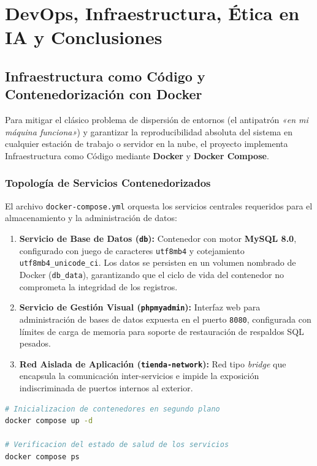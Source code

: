 ﻿\chapter{DevOps, Infraestructura, Ética en IA y Conclusiones}
\label{cap:devops_conclusiones}

\section{Infraestructura como Código y Contenedorización con Docker}
Para mitigar el clásico problema de dispersión de entornos (el antipatrón \textit{«en mi máquina funciona»}) y garantizar la reproducibilidad absoluta del sistema en cualquier estación de trabajo o servidor en la nube, el proyecto implementa Infraestructura como Código mediante \textbf{Docker} y \textbf{Docker Compose}.

\subsection{Topología de Servicios Contenedorizados}
El archivo \texttt{docker-compose.yml} orquesta los servicios centrales requeridos para el almacenamiento y la administración de datos:
\begin{enumerate}
    \item \textbf{Servicio de Base de Datos (\texttt{db}):} Contenedor con motor \textbf{MySQL 8.0}, configurado con juego de caracteres \texttt{utf8mb4} y cotejamiento \texttt{utf8mb4\_unicode\_ci}. Los datos se persisten en un volumen nombrado de Docker (\texttt{db\_data}), garantizando que el ciclo de vida del contenedor no comprometa la integridad de los registros.
    \item \textbf{Servicio de Gestión Visual (\texttt{phpmyadmin}):} Interfaz web para administración de bases de datos expuesta en el puerto \texttt{8080}, configurada con límites de carga de memoria para soporte de restauración de respaldos SQL pesados.
    \item \textbf{Red Aislada de Aplicación (\texttt{tienda-network}):} Red tipo \textit{bridge} que encapsula la comunicación inter-servicios e impide la exposición indiscriminada de puertos internos al exterior.
\end{enumerate}

\begin{lstlisting}[language=bash, caption={Arranque de la Infraestructura de Base de Datos}, label={lst:docker_run}]
# Inicializacion de contenedores en segundo plano
docker compose up -d

# Verificacion del estado de salud de los servicios
docker compose ps
\end{lstlisting}

